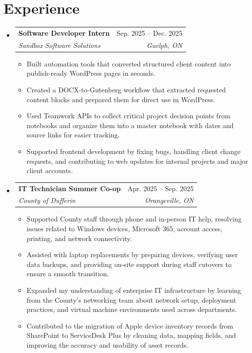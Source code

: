 \documentclass[letterpaper,11pt]{article}
\makeatletter
\newcommand{\resumeItem}[1]{
  \item\small{
    {#1 \vspace{-2pt}}
  }
}
\newcommand{\resumeSubheading}[4]{
  \vspace{-2pt}\item
    \begin{tabular*}{0.97\textwidth}[t]{l@{\extracolsep{\fill}}r}
      \textbf{#1} & #2 \\
      \textit{\small#3} & \textit{\small #4} \\
    \end{tabular*}\vspace{-7pt}
}
\newcommand{\resumeSubSubheading}[2]{
    \item
    \begin{tabular*}{0.97\textwidth}{l@{\extracolsep{\fill}}r}
      \textit{\small#1} & \textit{\small #2} \\
    \end{tabular*}\vspace{-7pt}
}
\newcommand{\resumeSubHeadingListStart}{\begin{itemize}[leftmargin=0.15in, label={}]}
\newcommand{\resumeSubHeadingListEnd}{\end{itemize}}
\newcommand{\resumeItemListStart}{\begin{itemize}}
\newcommand{\resumeItemListEnd}{\end{itemize}\vspace{-5pt}}
\makeatother
\begin{document}
\section{Experience}
  \resumeSubHeadingListStart

          


\resumeSubheading
  {Software Developer Intern}{Sep. 2025 -- Dec. 2025}
  {Sandbox Software Solutions}{Guelph, ON}
  \resumeItemListStart
    \resumeItem{Built automation tools that converted structured client content into publish-ready WordPress pages in seconds.}
    \resumeItem{Created a DOCX-to-Gutenberg workflow that extracted requested content blocks and prepared them for direct use in WordPress.}
    \resumeItem{Used Teamwork APIs to collect critical project decision points from notebooks and organize them into a master notebook with dates and source links for easier tracking.}
    \resumeItem{Supported frontend development by fixing bugs, handling client change requests, and contributing to web updates for internal projects and major client accounts.}
  \resumeItemListEnd
    
    \resumeSubheading
  {IT Technician Summer Co-op}{Apr. 2025 -- Sep. 2025}
  {County of Dufferin}{Orangeville, ON}
  \resumeItemListStart
    \resumeItem{Supported County staff through phone and in-person IT help, resolving issues related to Windows devices, Microsoft 365, account access, printing, and network connectivity.}
    \resumeItem{Assisted with laptop replacements by preparing devices, verifying user data backups, and providing on-site support during staff cutovers to ensure a smooth transition.}
    \resumeItem{Expanded my understanding of enterprise IT infrastructure by learning from the County’s networking team about network setup, deployment practices, and virtual machine environments used across departments.}
    \resumeItem{Contributed to the migration of Apple device inventory records from SharePoint to ServiceDesk Plus by cleaning data, mapping fields, and improving the accuracy and usability of asset records.}
  \resumeItemListEnd

  \resumeSubHeadingListEnd
\end{document}
